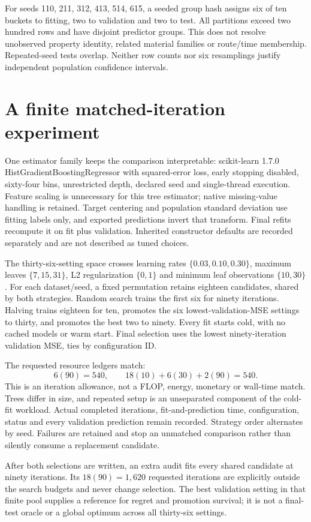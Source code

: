 \documentclass[11pt]{article}
\begin{document}
For seeds 110, 211, 312, 413, 514, 615, a seeded group hash assigns six of ten buckets to fitting, two to validation and two to test. All partitions exceed two hundred rows and have disjoint predictor groups. This does not resolve unobserved property identity, related material families or route/time membership. Repeated-seed tests overlap. Neither row counts nor six resamplings justify independent population confidence intervals.
\section{A finite matched-iteration experiment}
One estimator family keeps the comparison interpretable: scikit-learn 1.7.0 HistGradientBoostingRegressor with squared-error loss, early stopping disabled, sixty-four bins, unrestricted depth, declared seed and single-thread execution. Feature scaling is unnecessary for this tree estimator; native missing-value handling is retained. Target centering and population standard deviation use fitting labels only, and exported predictions invert that transform. Final refits recompute it on fit plus validation. Inherited constructor defaults are recorded separately and are not described as tuned choices.

The thirty-six-setting space crosses learning rates $\{0.03,0.10,0.30\}$, maximum leaves $\{7,15,31\}$, L2 regularization $\{0,1\}$ and minimum leaf observations $\{10,30\}$. For each dataset/seed, a fixed permutation retains eighteen candidates, shared by both strategies. Random search trains the first six for ninety iterations. Halving trains eighteen for ten, promotes the six lowest-validation-MSE settings to thirty, and promotes the best two to ninety. Every fit starts cold, with no cached models or warm start. Final selection uses the lowest ninety-iteration validation MSE, ties by configuration ID.

The requested resource ledgers match:
\[
6(90)=540,\qquad 18(10)+6(30)+2(90)=540.
\]
This is an iteration allowance, not a FLOP, energy, monetary or wall-time match. Trees differ in size, and repeated setup is an unseparated component of the cold-fit workload. Actual completed iterations, fit-and-prediction time, configuration, status and every validation prediction remain recorded. Strategy order alternates by seed. Failures are retained and stop an unmatched comparison rather than silently consume a replacement candidate.

After both selections are written, an extra audit fits every shared candidate at ninety iterations. Its $18(90)=1,620$ requested iterations are explicitly outside the search budgets and never change selection. The best validation setting in that finite pool supplies a reference for regret and promotion survival; it is not a final-test oracle or a global optimum across all thirty-six settings.
\end{document}
